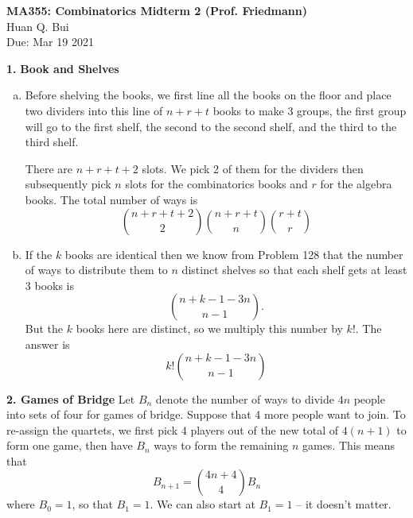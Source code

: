 \documentclass[11pt]{article}
\begin{document}
	\begin{framed}
\begin{center}
{\large \bf MA355: Combinatorics Midterm 2 (Prof. Friedmann)}\\
{ Huan Q. Bui}\\
Due: Mar 19 2021
\end{center}
\end{framed}







\noindent \textbf{1.} \textbf{Book and Shelves}
\begin{enumerate}[(a)]
	\item Before shelving the books, we first line all the books on the floor and place two dividers into this line of $n+r+t$ books to make 3 groups, the first group will go to the first shelf, the second to the second shelf, and the third to the third shelf.  
	
	There are $n+r+t+2$ slots. We pick 2 of them for the dividers then subsequently pick $n$ slots for the combinatorics books and $r$ for the algebra books. The total number of ways is
	\begin{equation*}
	\boxed{{ n+r+t+2\choose{2}} { n+r+t\choose{n} }{ r+t\choose{r} }}
	\end{equation*}
	
	
	\item If the $k$ books are identical then we know from Problem 128 that the number of ways to distribute them to $n$ distinct shelves so that each shelf gets at least 3 books is 
	\begin{equation*}
	{ n+k-1-3n \choose{n-1}}.
	\end{equation*}
	But the $k$ books here are distinct, so we multiply this number by $k!$. The answer is 
	\begin{equation*}
	\boxed{k! { n+k-1-3n \choose{n-1}}}
	\end{equation*}
\end{enumerate}



\noindent \textbf{2. Games of Bridge} 
\noindent Let $B_n$ denote the number of ways to divide $4n$ people into sets of four for games of bridge. Suppose that 4 more people want to join. To re-assign the quartets, we first pick 4 players out of the new total of $4(n+1)$ to form one game, then have $B_n$ ways to form the remaining $n$ games. This means that
\begin{equation*}
\boxed{B_{n+1} = {4n+4 \choose 4} B_n} 
\end{equation*} 
where $B_0 = 1$, so that $B_1 = 1$. We can also start at $B_1=1$ -- it doesn't matter. 
\end{document}
